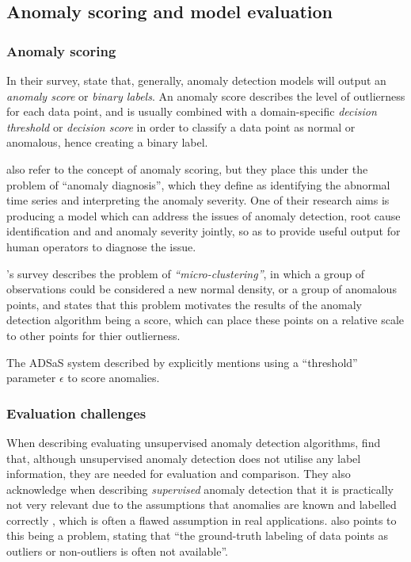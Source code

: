 \documentclass{mproj}
\begin{document}
\subsection{Anomaly scoring and model evaluation}

\subsubsection{Anomaly scoring}
\label{subsubsection:anomaly-scoring}

In their survey, \cite{deepLearningSurvey} state that, generally, anomaly detection models will output an \textit{anomaly score} or \textit{binary labels}. An anomaly score describes the level of outlierness for each data point, and is usually combined with a domain-specific \textit{decision threshold} or \textit{decision score} in order to classify a data point as normal or anomalous, hence creating a binary label.

\cite{deepMultivariateNetwork} also refer to the concept of anomaly scoring, but they place this under the problem of ``anomaly diagnosis'', which they define as identifying the abnormal time series and interpreting the anomaly severity. One of their research aims is producing a model which can address the issues of anomaly detection, root cause identification and and anomaly severity jointly, so as to provide useful output for human operators to diagnose the issue.

\cite{comparativeUnsupervisedEvaluation}'s survey  describes the problem of \textit{``micro-clustering''}, in which a group of observations could be considered a new normal density, or a group of anomalous points, and states that this problem motivates the results of the anomaly detection algorithm being a score, which can place these points on a relative scale to other points for thier outlierness.

The ADSaS system described by \cite{ADSaS} explicitly mentions using a ``threshold'' parameter $\epsilon$ to score anomalies.

\subsubsection{Evaluation challenges}

When describing evaluating unsupervised anomaly detection algorithms, \cite{comparativeUnsupervisedEvaluation} find that, although unsupervised anomaly detection does not utilise any label information, they are needed for evaluation and comparison. They also acknowledge when describing \textit{supervised} anomaly detection that it is practically not very relevant due to the assumptions that anomalies are known and labelled correctly \citep{comparativeUnsupervisedEvaluation}, which is often a flawed assumption in real applications. \cite{outlierAnalysisBook} also points to this being a problem, stating that ``the ground-truth labeling of data points as outliers or non-outliers is often not available''.
\end{document}
